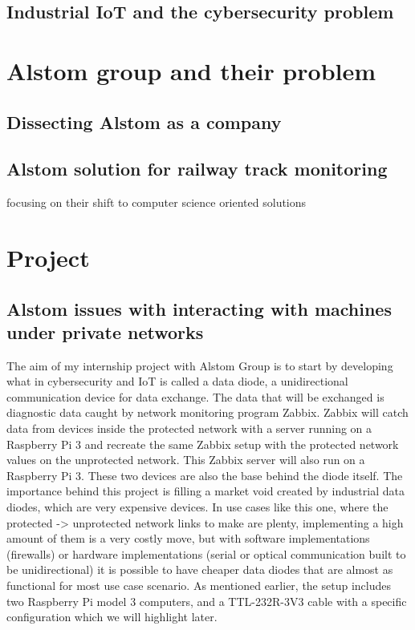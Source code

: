 \documentclass[a4paper, 12pt]{book}
\begin{document}
\section{Industrial IoT and the cybersecurity problem}

\chapter{Alstom group and their problem}

\section{Dissecting Alstom as a company}
\section{Alstom solution for railway track monitoring}
focusing on their shift to computer science oriented solutions

\chapter{Project}

\section{Alstom issues with interacting with machines under private networks}
The aim of my internship project with Alstom Group is to start by developing what in cybersecurity and IoT is called a data diode, a unidirectional communication device for data exchange.
The data that will be exchanged is diagnostic data caught by network monitoring program Zabbix. Zabbix will catch data from devices inside the protected network with a server running on a Raspberry Pi 3 and recreate the same Zabbix setup with the protected network values on the unprotected network. This Zabbix server will also run on a Raspberry Pi 3. These two devices are also the base behind the diode itself.
The importance behind this project is filling a market void created by industrial data diodes, which are very expensive devices. In use cases like this one, where the protected -> unprotected network links to make are plenty, implementing a high amount of them is a very costly move, but with software implementations (firewalls) or hardware implementations (serial or optical communication built to be unidirectional) it is possible to have cheaper data diodes that are almost as functional for most use case scenario. As mentioned earlier, the setup includes two Raspberry Pi model 3 computers, and a TTL-232R-3V3 cable with a specific configuration which we will highlight later.
\end{document}
